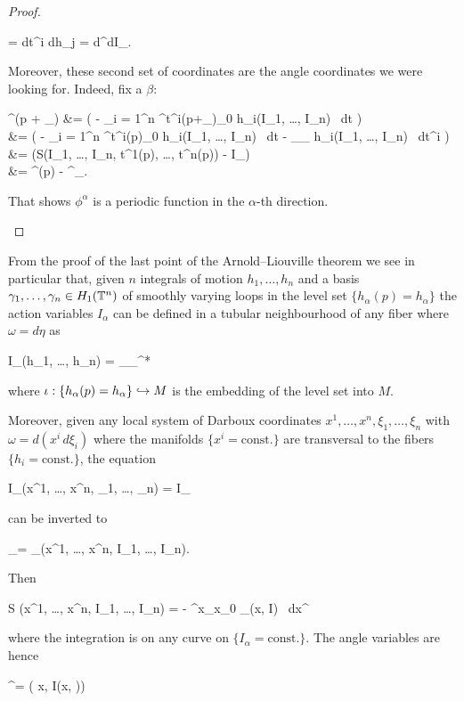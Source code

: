\documentclass[main.tex]{subfiles}
\begin{document}
\begin{proof}
\begin{enumerate}
		\begin{eqalign}
			\omega = dt^i \wedge dh_j = d\phi^\alpha \wedge dI_\alpha.
		\end{eqalign}
		Moreover, these second set of coordinates are the angle coordinates we were looking for. Indeed, fix a $\beta$:
		\begin{eqalign}
			\phi^\alpha(p + \gamma_\beta) &=  \left( - \sum_{i = 1}^n \int^{t^i(p+\gamma_\beta)}_{0} h_i(I_1, \ldots, I_n) \, dt \right)\\
			&=  \left( - \sum_{i = 1}^n \int^{t^i(p)}_{0} h_i(I_1, \ldots, I_n) \, dt  - \int_{\gamma_\beta} h_i(I_1, \ldots, I_n) \, dt^i \right)\\
			&=  (S(I_1, \ldots, I_n, t^1(p), \ldots, t^n(p)) - I_\beta)\\
			&= \phi^\alpha(p) - \delta^\alpha_\beta.
		\end{eqalign}
		That shows $\phi^\alpha$ is a periodic function in the $\alpha$-th direction.
	\end{enumerate}
\end{proof}

\begin{remark}
	From the proof of the last point of the Arnold--Liouville theorem we see in particular that, given $n$ integrals of motion $h_1, \ldots, h_n$ and a basis $\gamma_1,\ldots, \gamma_n \in H_1(\mathbb{T}^n)$ of smoothly varying loops in the level set $\{h_\alpha (p) = h_\alpha\}$ the action variables $I_\alpha$ can be defined in a tubular neighbourhood of any fiber where $\omega = d\eta$ as
	\begin{eqalign}
		I_\alpha (h_1, \ldots, h_n) = \int_{\gamma_\alpha}\iota^*\eta
	\end{eqalign}
	where $\iota : \{h_\alpha(p) = h_\alpha\} \hookrightarrow M$ is the embedding of the level set into $M$. 
	
	Moreover, given any local system of Darboux coordinates $x^1, \ldots, x^n, \xi_1, \ldots, \xi_n$ with $\omega = d(x^i \, d\xi_i)$ where the manifolds $\{x^i = \text{const.}\}$ are transversal to the fibers $\{h_i = \text{const.}\}$, the equation
	\begin{eqalign}
		I_\alpha (x^1, \ldots, x^n, \xi_1, \ldots, \xi_n) = I_\alpha
	\end{eqalign}
	can be inverted to 
	\begin{eqalign}
		\xi_\alpha = \xi_\alpha(x^1, \ldots, x^n, I_1, \ldots, I_n).
	\end{eqalign}
	Then
	\begin{eqalign}
		S (x^1, \ldots, x^n, I_1, \ldots, I_n) = - \int^x_{x_0} \xi_\alpha (x, I) \, dx^\alpha
	\end{eqalign}
	where the integration is on any curve on $\{I_\alpha = \text{const.}\}$. The angle variables are hence
	\begin{eqalign}
		\phi^\alpha =  ( x, I(x, \xi))
	\end{eqalign}
\end{remark}
\end{document}
